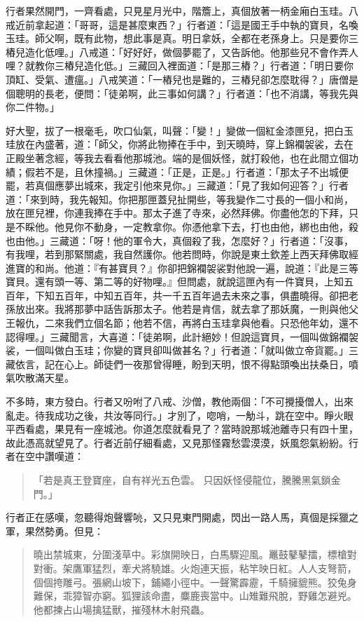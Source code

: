 行者果然開門，一齊看處，只見星月光中，階簷上，真個放著一柄金廂白玉珪。八戒近前拿起道：「哥哥，這是甚麼東西？」行者道：「這是國王手中執的寶貝，名喚玉珪。師父啊，既有此物，想此事是真。明日拿妖，全都在老孫身上。只是要你三樁兒造化低哩。」八戒道：「好好好，做個夢罷了，又告訴他。他那些兒不會作弄人哩？就教你三樁兒造化低。」三藏回入裡面道：「是那三樁？」行者道：「明日要你頂缸、受氣、遭瘟。」八戒笑道：「一樁兒也是難的，三樁兒卻怎麼耽得？」唐僧是個聰明的長老，便問：「徒弟啊，此三事如何講？」行者道：「也不消講，等我先與你二件物。」

好大聖，拔了一根毫毛，吹口仙氣，叫聲：「變！」變做一個紅金漆匣兒，把白玉珪放在內盛著，道：「師父，你將此物捧在手中，到天曉時，穿上錦襴袈裟，去在正殿坐著念經，等我去看看他那城池。端的是個妖怪，就打殺他，也在此間立個功績；假若不是，且休撞禍。」三藏道：「正是，正是。」行者道：「那太子不出城便罷，若真個應夢出城來，我定引他來見你。」三藏道：「見了我如何迎答？」行者道：「來到時，我先報知。你把那匣蓋兒扯開些，等我變作二寸長的一個小和尚，放在匣兒裡，你連我捧在手中。那太子進了寺來，必然拜佛。你盡他怎的下拜，只是不睬他。他見你不動身，一定教拿你。你憑他拿下去，打也由他，綁也由他，殺也由他。」三藏道：「呀！他的軍令大，真個殺了我，怎麼好？」行者道：「沒事，有我哩，若到那緊關處，我自然護你。他若問時，你說是東土欽差上西天拜佛取經進寶的和尚。他道：『有甚寶貝？』你卻把錦襴袈裟對他說一遍，說道：『此是三等寶貝。還有頭一等、第二等的好物哩。』但問處，就說這匣內有一件寶貝，上知五百年，下知五百年，中知五百年，共一千五百年過去未來之事，俱盡曉得。卻把老孫放出來。我將那夢中話告訴那太子。他若是肯信，就去拿了那妖魔，一則與他父王報仇，二來我們立個名節；他若不信，再將白玉珪拿與他看。只恐他年幼，還不認得哩。」三藏聞言，大喜道：「徒弟啊，此計絕妙！但說這寶貝，一個叫做錦襴袈裟，一個叫做白玉珪；你變的寶貝卻叫做甚名？」行者道：「就叫做立帝貨罷。」三藏依言，記在心上。師徒們一夜那曾得睡，盼到天明，恨不得點頭喚出扶桑日，噴氣吹散滿天星。

不多時，東方發白。行者又吩咐了八戒、沙僧，教他兩個：「不可攪擾僧人，出來亂走。待我成功之後，共汝等同行。」才別了，唿哨，一觔斗，跳在空中。睜火眼平西看處，果見有一座城池。你道怎麼就看見了？當時說那城池離寺只有四十里，故此憑高就望見了。行者近前仔細看處，又見那怪霧愁雲漠漠，妖風怨氣紛紛。行者在空中讚嘆道：
\begin{quote}
「若是真王登寶座，自有祥光五色雲。
只因妖怪侵龍位，騰騰黑氣鎖金門。」
\end{quote}

行者正在感嘆，忽聽得炮聲響喨，又只見東門開處，閃出一路人馬，真個是採獵之軍，果然勢勇。但見：
\begin{quote}
曉出禁城東，分圍淺草中。彩旗開映日，白馬驟迎風。鼉鼓鼕鼕擂，標槍對對衝。架鷹軍猛烈，牽犬將驍雄。火炮連天振，粘竿映日紅。人人支弩箭，個個挎雕弓。張網山坡下，鋪繩小徑中。一聲驚霹靂，千騎擁貔熊。狡兔身難保，乖獐智亦窮。狐狸該命盡，麋鹿喪當中。山雉難飛脫，野雞怎避兇。他都揀占山場擒猛獸，摧殘林木射飛蟲。
\end{quote}

